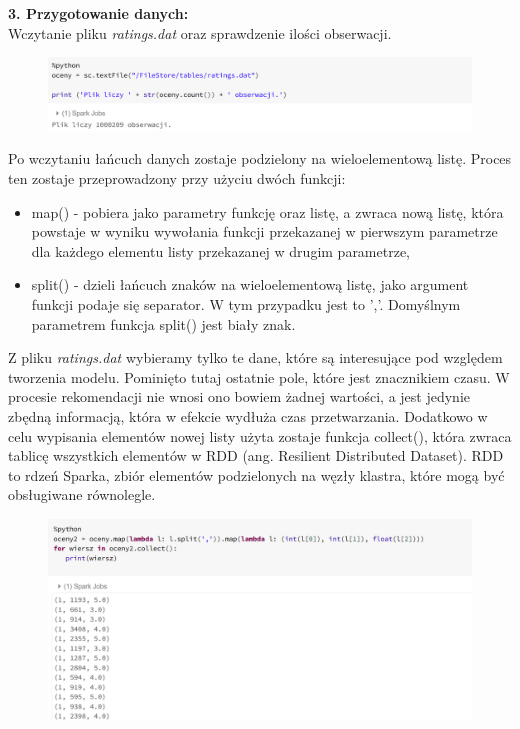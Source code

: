 \documentclass[12pt,a4paper]{report}
\begin{document}
\textbf{3. Przygotowanie danych:}
\\Wczytanie pliku \textit{ratings.dat} oraz sprawdzenie ilości obserwacji.

\begin{figure}[H]
\includegraphics[scale=0.5]{obrazy/ALS2.PNG} 
\end{figure}


Po wczytaniu łańcuch danych zostaje podzielony na wieloelementową listę. Proces ten zostaje przeprowadzony przy użyciu dwóch funkcji:
\begin{itemize}
\item map() - pobiera jako parametry funkcję oraz listę, a zwraca nową listę, która powstaje w wyniku wywołania funkcji przekazanej w pierwszym parametrze dla każdego elementu listy przekazanej w drugim parametrze,
\item split() - dzieli łańcuch znaków na wieloelementową listę, jako argument funkcji podaje się separator. W tym przypadku jest to ','. Domyślnym parametrem funkcja split() jest biały znak.
\end{itemize}
Z pliku \textit{ratings.dat} wybieramy tylko te dane, które są interesujące pod względem tworzenia modelu. Pominięto tutaj ostatnie pole, które jest znacznikiem czasu. W procesie rekomendacji nie wnosi ono bowiem żadnej wartości, a jest jedynie zbędną informacją, która w efekcie wydłuża czas przetwarzania.
Dodatkowo w celu wypisania elementów nowej listy użyta zostaje funkcja collect(), która zwraca tablicę wszystkich elementów w RDD (ang. Resilient Distributed Dataset). RDD to rdzeń Sparka,  zbiór elementów podzielonych na węzły klastra, które mogą być obsługiwane równolegle.

\begin{figure}[H]
\includegraphics[scale=0.5]{obrazy/ALS3.PNG} 
\end{figure}
\end{document}
